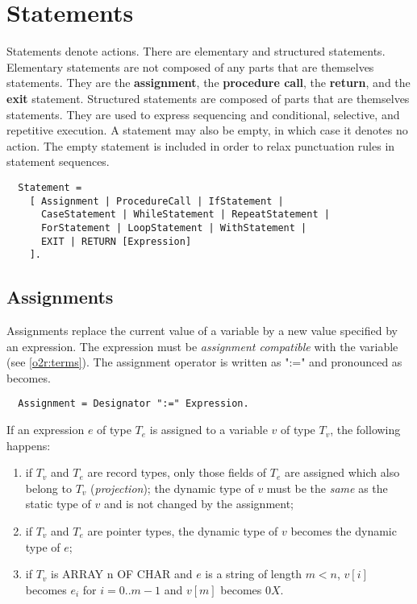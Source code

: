 \section{Statements}

Statements denote actions. There are elementary and structured statements.
Elementary statements are not composed of any parts that are themselves
statements. They are the {\bf assignment}, the {\bf procedure call},
the {\bf return}, and the {\bf exit} statement. Structured statements
are composed of parts that are themselves statements. They are used
to express sequencing and conditional, selective, and repetitive execution.
A statement may also be empty, in which case it denotes no action.
The empty statement is included in order to relax punctuation rules
in statement sequences.
{\BNFsize
\begin{verbatim}
  Statement =
    [ Assignment | ProcedureCall | IfStatement |
      CaseStatement | WhileStatement | RepeatStatement |
      ForStatement | LoopStatement | WithStatement |
      EXIT | RETURN [Expression]
    ].
\end{verbatim}}

\subsection{Assignments}

Assignments replace the current value of a variable by a new value
specified by an expression. The expression must be {\em assignment
compatible} with the variable (see \ref{o2r:terms}).
The assignment operator is written as ":=" and pronounced as becomes.
{\BNFsize
\begin{verbatim}
  Assignment = Designator ":=" Expression.
\end{verbatim}}

If an expression $e$ of type $T_e$ is assigned to a variable $v$ of type
$T_v$, the following happens:
\begin{enumerate}
\item
if $T_v$ and $T_e$ are record types, only those fields
of $T_e$ are assigned which also belong to $T_v$ ({\em projection}); the
dynamic type of $v$ must be the {\em same} as the static type of $v$ and is
not changed by the assignment;
\item
if $T_v$ and $T_e$ are pointer types, the dynamic type
of $v$ becomes the dynamic type of $e$;
\item
if $T_v$ is ARRAY n OF CHAR and $e$ is a string of length
$m < n$, $v[i]$ becomes $e_i$ for $i=0..m-1$ and $v[m]$ becomes $0X$.
\end{enumerate}

